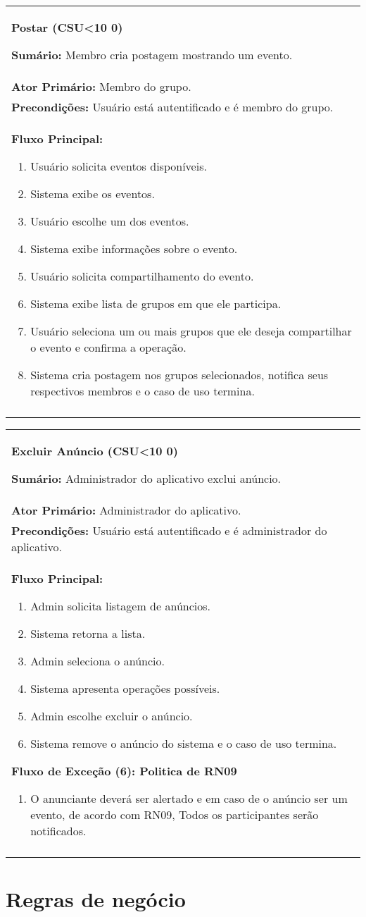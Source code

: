 \documentclass{article}
\newcounter{cscounter}
\newcommand{\sumario}[1] {\textbf{Sumário:} #1\\ }
\newcommand{\ator}[1] {\textbf{Ator Primário:} #1\\}
\newcommand{\precond}[1] {\textbf{Precondições:} #1\\}
\newcommand{\fluxo}{\textbf{Fluxo Principal:}}
\newenvironment{fluxoe}[2]
	{
		\textbf{Fluxo de Exceção (#1): #2}
		\begin{enumerate}[itemsep=0mm, label=(\alph*)]			
	}
	{
		\end{enumerate}			
	}
\newenvironment{casosdeuso}[1]
{
 \stepcounter{cscounter}
 \begin{center}
 \begin{tabular}{|p{\textwidth}|}
 \hline
 \begin{center}
 \large \textbf{#1 (CSU\ifnum\value{cscounter}<10 0\fi\arabic{cscounter})}
 \end{center}
}
{ 
 \\\\\hline
 \end{tabular} 
 \end{center}
}
\begin{document}
\begin{casosdeuso}{Postar}
 \sumario{Membro cria postagem mostrando um evento.}
 \ator{Membro do grupo.}
 \precond{Usuário está autentificado e é membro do grupo.}
\fluxo
\begin{enumerate}[itemsep=0mm]
 \item Usuário solicita eventos disponíveis.
 \item Sistema exibe os eventos.
 \item Usuário escolhe um dos eventos.
 \item Sistema exibe informações sobre o evento.
 \item Usuário solicita compartilhamento do evento.
 \item Sistema exibe lista de grupos em que ele participa.
 \item Usuário seleciona um ou mais grupos que ele deseja compartilhar o evento e confirma a operação.
 \item Sistema cria postagem nos grupos selecionados, notifica seus respectivos membros e o caso de uso termina.
\end{enumerate}
\end{casosdeuso}

\begin{casosdeuso}{Excluir Anúncio}
 \sumario{Administrador do aplicativo exclui anúncio.}
 \ator{Administrador do aplicativo.}
 \precond{Usuário está autentificado e é administrador do aplicativo.}
\fluxo
\begin{enumerate}[itemsep=0mm]
 \item Admin solicita listagem de anúncios.
 \item Sistema retorna a lista.
 \item Admin seleciona o anúncio.
 \item Sistema apresenta operações possíveis.
 \item Admin escolhe excluir o anúncio.
 \item Sistema remove o anúncio do sistema e o caso de uso termina.
\end{enumerate}
\begin{fluxoe}{6}{Politica de RN09}
\item O anunciante deverá ser alertado e em caso de o anúncio ser um evento, de acordo com RN09, Todos os participantes serão notificados.
\end{fluxoe}
\end{casosdeuso}

\section{Regras de negócio} 
\end{document}
